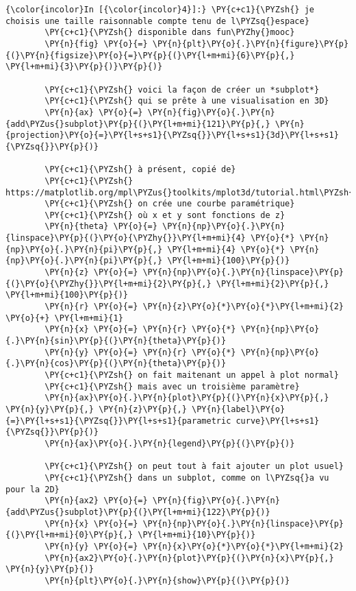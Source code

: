     \begin{Verbatim}[commandchars=\\\{\}]
{\color{incolor}In [{\color{incolor}4}]:} \PY{c+c1}{\PYZsh{} je choisis une taille raisonnable compte tenu de l\PYZsq{}espace}
        \PY{c+c1}{\PYZsh{} disponible dans fun\PYZhy{}mooc}
        \PY{n}{fig} \PY{o}{=} \PY{n}{plt}\PY{o}{.}\PY{n}{figure}\PY{p}{(}\PY{n}{figsize}\PY{o}{=}\PY{p}{(}\PY{l+m+mi}{6}\PY{p}{,} \PY{l+m+mi}{3}\PY{p}{)}\PY{p}{)}
        
        \PY{c+c1}{\PYZsh{} voici la façon de créer un *subplot*}
        \PY{c+c1}{\PYZsh{} qui se prête à une visualisation en 3D}
        \PY{n}{ax} \PY{o}{=} \PY{n}{fig}\PY{o}{.}\PY{n}{add\PYZus{}subplot}\PY{p}{(}\PY{l+m+mi}{121}\PY{p}{,} \PY{n}{projection}\PY{o}{=}\PY{l+s+s1}{\PYZsq{}}\PY{l+s+s1}{3d}\PY{l+s+s1}{\PYZsq{}}\PY{p}{)}
        
        \PY{c+c1}{\PYZsh{} à présent, copié de}
        \PY{c+c1}{\PYZsh{} https://matplotlib.org/mpl\PYZus{}toolkits/mplot3d/tutorial.html\PYZsh{}line\PYZhy{}plots}
        \PY{c+c1}{\PYZsh{} on crée une courbe paramétrique}
        \PY{c+c1}{\PYZsh{} où x et y sont fonctions de z}
        \PY{n}{theta} \PY{o}{=} \PY{n}{np}\PY{o}{.}\PY{n}{linspace}\PY{p}{(}\PY{o}{\PYZhy{}}\PY{l+m+mi}{4} \PY{o}{*} \PY{n}{np}\PY{o}{.}\PY{n}{pi}\PY{p}{,} \PY{l+m+mi}{4} \PY{o}{*} \PY{n}{np}\PY{o}{.}\PY{n}{pi}\PY{p}{,} \PY{l+m+mi}{100}\PY{p}{)}
        \PY{n}{z} \PY{o}{=} \PY{n}{np}\PY{o}{.}\PY{n}{linspace}\PY{p}{(}\PY{o}{\PYZhy{}}\PY{l+m+mi}{2}\PY{p}{,} \PY{l+m+mi}{2}\PY{p}{,} \PY{l+m+mi}{100}\PY{p}{)}
        \PY{n}{r} \PY{o}{=} \PY{n}{z}\PY{o}{*}\PY{o}{*}\PY{l+m+mi}{2} \PY{o}{+} \PY{l+m+mi}{1}
        \PY{n}{x} \PY{o}{=} \PY{n}{r} \PY{o}{*} \PY{n}{np}\PY{o}{.}\PY{n}{sin}\PY{p}{(}\PY{n}{theta}\PY{p}{)}
        \PY{n}{y} \PY{o}{=} \PY{n}{r} \PY{o}{*} \PY{n}{np}\PY{o}{.}\PY{n}{cos}\PY{p}{(}\PY{n}{theta}\PY{p}{)}
        \PY{c+c1}{\PYZsh{} on fait maitenant un appel à plot normal}
        \PY{c+c1}{\PYZsh{} mais avec un troisième paramètre}
        \PY{n}{ax}\PY{o}{.}\PY{n}{plot}\PY{p}{(}\PY{n}{x}\PY{p}{,} \PY{n}{y}\PY{p}{,} \PY{n}{z}\PY{p}{,} \PY{n}{label}\PY{o}{=}\PY{l+s+s1}{\PYZsq{}}\PY{l+s+s1}{parametric curve}\PY{l+s+s1}{\PYZsq{}}\PY{p}{)}
        \PY{n}{ax}\PY{o}{.}\PY{n}{legend}\PY{p}{(}\PY{p}{)}
        
        \PY{c+c1}{\PYZsh{} on peut tout à fait ajouter un plot usuel}
        \PY{c+c1}{\PYZsh{} dans un subplot, comme on l\PYZsq{}a vu pour la 2D}
        \PY{n}{ax2} \PY{o}{=} \PY{n}{fig}\PY{o}{.}\PY{n}{add\PYZus{}subplot}\PY{p}{(}\PY{l+m+mi}{122}\PY{p}{)}
        \PY{n}{x} \PY{o}{=} \PY{n}{np}\PY{o}{.}\PY{n}{linspace}\PY{p}{(}\PY{l+m+mi}{0}\PY{p}{,} \PY{l+m+mi}{10}\PY{p}{)}
        \PY{n}{y} \PY{o}{=} \PY{n}{x}\PY{o}{*}\PY{o}{*}\PY{l+m+mi}{2}
        \PY{n}{ax2}\PY{o}{.}\PY{n}{plot}\PY{p}{(}\PY{n}{x}\PY{p}{,} \PY{n}{y}\PY{p}{)}
        \PY{n}{plt}\PY{o}{.}\PY{n}{show}\PY{p}{(}\PY{p}{)}
\end{Verbatim}


